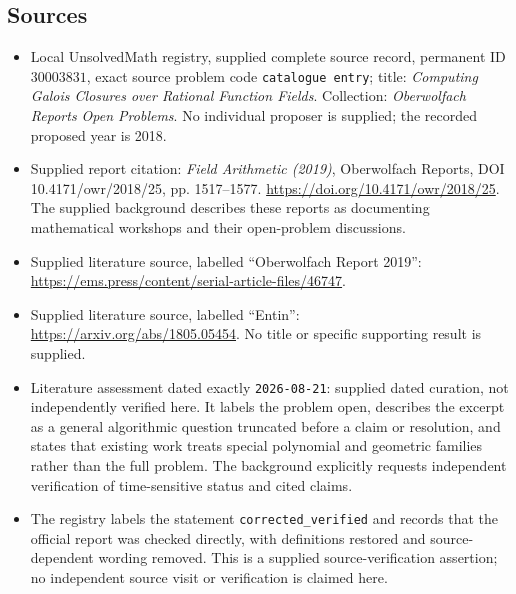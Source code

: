 \documentclass[11pt]{article}
\begin{document}
\subsection{Sources}
\begin{itemize}
\item Local UnsolvedMath registry, supplied complete source record, permanent ID \(30003831\), exact source problem code \texttt{catalogue entry}; title: \emph{Computing Galois Closures over Rational Function Fields}. Collection: \emph{Oberwolfach Reports Open Problems}. No individual proposer is supplied; the recorded proposed year is 2018.
\item Supplied report citation: \emph{Field Arithmetic (2019)}, Oberwolfach Reports, DOI 10.4171/owr/2018/25, pp. 1517--1577. \url{https://doi.org/10.4171/owr/2018/25}. The supplied background describes these reports as documenting mathematical workshops and their open-problem discussions.
\item Supplied literature source, labelled ``Oberwolfach Report 2019'': \url{https://ems.press/content/serial-article-files/46747}.
\item Supplied literature source, labelled ``Entin'': \url{https://arxiv.org/abs/1805.05454}. No title or specific supporting result is supplied.
\item Literature assessment dated exactly \texttt{2026-08-21}: supplied dated curation, not independently verified here. It labels the problem open, describes the excerpt as a general algorithmic question truncated before a claim or resolution, and states that existing work treats special polynomial and geometric families rather than the full problem. The background explicitly requests independent verification of time-sensitive status and cited claims.
\item The registry labels the statement \texttt{corrected\_verified} and records that the official report was checked directly, with definitions restored and source-dependent wording removed. This is a supplied source-verification assertion; no independent source visit or verification is claimed here.
\end{itemize}
\end{document}
